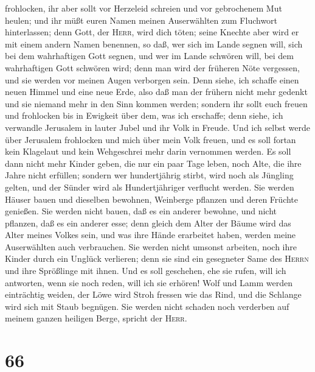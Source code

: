 frohlocken, ihr aber sollt vor Herzeleid schreien und vor gebrochenem
Mut heulen;  und ihr müßt euren Namen meinen Auserwählten
zum Fluchwort hinterlassen; denn Gott, der \textsc{Herr}, wird dich
töten; seine Knechte aber wird er mit einem andern Namen benennen,
 so daß, wer sich im Lande segnen will, sich bei dem
wahrhaftigen Gott segnen, und wer im Lande schwören will, bei dem
wahrhaftigen Gott schwören wird; denn man wird der früheren Nöte
vergessen, und sie werden vor meinen Augen verborgen sein.
 Denn siehe, ich schaffe einen neuen Himmel und eine neue
Erde, also daß man der frühern nicht mehr gedenkt und sie niemand mehr
in den Sinn kommen werden;  sondern ihr sollt euch freuen
und frohlocken bis in Ewigkeit über dem, was ich erschaffe; denn siehe,
ich verwandle Jerusalem in lauter Jubel und ihr Volk in Freude.
 Und ich selbst werde über Jerusalem frohlocken und mich
über mein Volk freuen, und es soll fortan kein Klagelaut und kein
Wehgeschrei mehr darin vernommen werden.  Es soll dann
nicht mehr Kinder geben, die nur ein paar Tage leben, noch Alte, die
ihre Jahre nicht erfüllen; sondern wer hundertjährig stirbt, wird noch
als Jüngling gelten, und der Sünder wird als Hundertjähriger verflucht
werden.  Sie werden Häuser bauen und dieselben bewohnen,
Weinberge pflanzen und deren Früchte genießen.  Sie
werden nicht bauen, daß es ein anderer bewohne, und nicht pflanzen, daß
es ein anderer esse; denn gleich dem Alter der Bäume wird das Alter
meines Volkes sein, und was ihre Hände erarbeitet haben, werden meine
Auserwählten auch verbrauchen.  Sie werden nicht umsonst
arbeiten, noch ihre Kinder durch ein Unglück verlieren; denn sie sind
ein gesegneter Same des \textsc{Herrn} und ihre Sprößlinge mit ihnen.
 Und es soll geschehen, ehe sie rufen, will ich
antworten, wenn sie noch reden, will ich sie erhören! 
Wolf und Lamm werden einträchtig weiden, der Löwe wird Stroh fressen wie
das Rind, und die Schlange wird sich mit Staub begnügen. Sie werden
nicht schaden noch verderben auf meinem ganzen heiligen Berge, spricht
der \textsc{Herr}.

\hypertarget{section-65}{%
\section{66}\label{section-65}}

